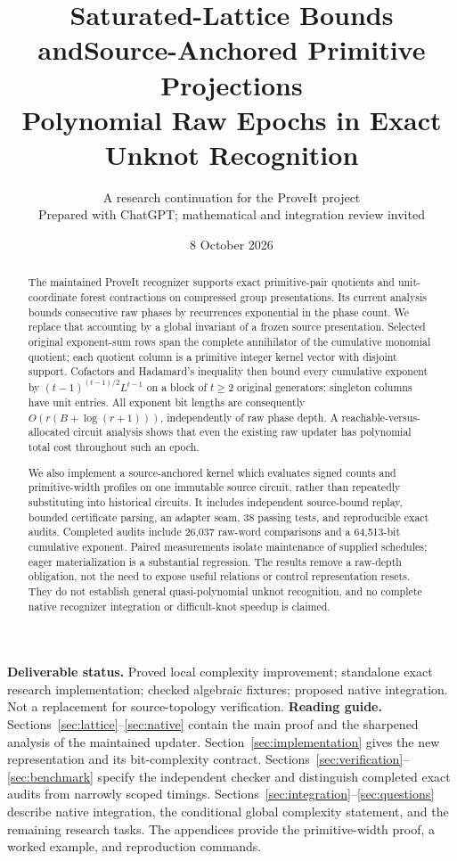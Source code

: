 \documentclass[11pt,letterpaper]{article}
\title{\textbf{Saturated-Lattice Bounds and\newline Source-Anchored Primitive Projections}\\[0.6em]
\large Polynomial Raw Epochs in Exact Unknot Recognition}
\author{A research continuation for the ProveIt project\\
\small Prepared with ChatGPT; mathematical and integration review invited}
\date{8 October 2026}
\theoremstyle{definition}
\theoremstyle{remark}\newtheorem{remark}[theorem]{Remark}
\begin{document}
\maketitle
\begin{abstract}
The maintained ProveIt recognizer supports exact primitive-pair quotients and
unit-coordinate forest contractions on compressed group presentations. Its
current analysis bounds consecutive raw phases by recurrences exponential in
the phase count. We replace that accounting by a global invariant of a frozen
source presentation. Selected original exponent-sum rows span the complete
annihilator of the cumulative monomial quotient; each quotient column is a
primitive integer kernel vector with disjoint support. Cofactors and Hadamard's
inequality then bound every cumulative exponent by
$(t-1)^{(t-1)/2}L^{t-1}$ on a block of $t\ge2$ original generators;
singleton columns have unit entries. All exponent bit
lengths are consequently $O(r(B+\log(r+1)))$, independently of raw phase depth.
A reachable-versus-allocated circuit analysis shows that even the existing raw
updater has polynomial total cost throughout such an epoch.

We also implement a source-anchored kernel which evaluates signed counts and
primitive-width profiles on one immutable source circuit, rather than repeatedly
substituting into historical circuits. It includes independent source-bound
replay, bounded certificate parsing, an adapter seam, 38 passing tests, and
reproducible exact audits. Completed audits include 26,037 raw-word comparisons
and a 64,513-bit cumulative exponent. Paired measurements isolate maintenance
of supplied schedules; eager materialization is a substantial regression.
The results remove a raw-depth obligation, not the need to expose useful
relations or control representation resets. They do not establish general
quasi-polynomial unknot recognition, and no complete native recognizer
integration or difficult-knot speedup is claimed.
\end{abstract}
\vspace{0.4em}
\noindent\textbf{Deliverable status.} Proved local complexity improvement;
standalone exact research implementation; checked algebraic fixtures; proposed
native integration. Not a replacement for source-topology verification.
\clearpage
\setcounter{tocdepth}{1}
\tableofcontents
\vspace{1.2em}
\noindent\textbf{Reading guide.}
Sections~\ref{sec:lattice}--\ref{sec:native} contain the main proof and the
sharpened analysis of the maintained updater. Section~\ref{sec:implementation}
gives the new representation and its bit-complexity contract.
Sections~\ref{sec:verification}--\ref{sec:benchmark} specify the independent
checker and distinguish completed exact audits from narrowly scoped timings.
Sections~\ref{sec:integration}--\ref{sec:questions} describe native integration,
the conditional global complexity statement, and the remaining research tasks.
The appendices provide the primitive-width proof, a worked example, and
reproduction commands.
\newpage
\end{document}
